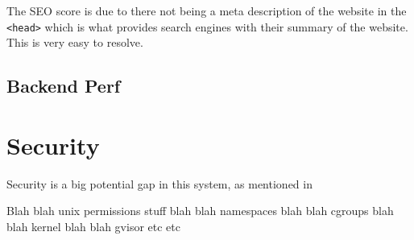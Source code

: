 The SEO score is due to there not being a meta description of the website in the \texttt{<head>} which is what provides search engines with their summary of the website. This is very easy to resolve. 

\subsection{Backend Perf}

\section{Security}


Security is a big potential gap in this system, as mentioned in 

Blah blah unix permissions stuff blah blah namespaces blah blah cgroups blah blah kernel blah blah gvisor etc etc

\pagebreak
